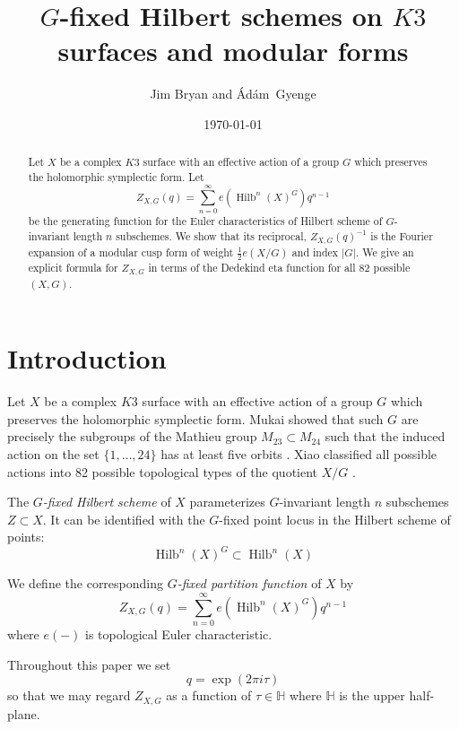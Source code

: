 \documentclass{article}
\title{$G$-fixed Hilbert schemes on $K3$ surfaces and modular forms}
\author{Jim Bryan and \'{A}d\'{a}m~Gyenge}
\date{\today}
\theoremstyle{definition}
\newcommand{\half}{\frac{1}{2}}
\newcommand{\HH}{\mathbb{H}}
\newcommand{\Hilb}{\operatorname{Hilb}}
\begin{document}
\maketitle

\tableofcontents

\begin{abstract}
Let $X$ be a complex $K3$ surface with an effective action of a group
$G$ which preserves the holomorphic symplectic form. Let 
\[
Z_{X,G}(q) = \sum_{n=0}^{\infty} e(\Hilb^{n}(X)^{G})q^{n-1}
\]
be the generating function for the Euler characteristics of Hilbert
scheme of $G$-invariant length $n$ subschemes. We show that its
reciprocal, $Z_{X,G}(q)^{-1}$ is the Fourier expansion of a modular
cusp form of weight $\half e(X/G)$ and index $|G|$. We give an
explicit formula for $Z_{X,G}$ in terms of the Dedekind eta function
for all 82 possible $(X,G)$. 
\end{abstract}








\section{Introduction}

Let $X$ be a complex $K3$ surface with an effective action of a group
$G$ which preserves the holomorphic symplectic form. Mukai showed that
such $G$ are precisely the subgroups of the Mathieu group
$M_{23}\subset M_{24}$ such that the induced action on the set
$\{1,\dots ,24 \}$ has at least five orbits
\cite{mukai1988finite}. Xiao classified all possible actions into
82 possible topological types of the quotient $X/G$ \cite{xiao1996galois}.

The \emph{$G$-fixed Hilbert scheme} of $X$ parameterizes
$G$-invariant length $n$ subschemes $Z\subset X$. It can be
identified with the $G$-fixed point locus in the Hilbert scheme of
points: 
\[
\Hilb^{n}(X)^{G} \subset \Hilb^{n}(X)
\]

We define the corresponding \emph{$G$-fixed partition function} of
$X$ by
\[
Z_{X,G}(q) = \sum_{n=0}^{\infty} e\left(\Hilb^{n}(X)^{G} \right) q^{n-1} 
\]
where $e(-)$ is topological Euler characteristic.

Throughout this paper we set
\[
q=\exp\left(2\pi i \tau  \right)
\]
so that we may regard $Z_{X,G}$ as a function of $\tau \in \HH$ where
$\HH$ is the upper half-plane.
\end{document}
